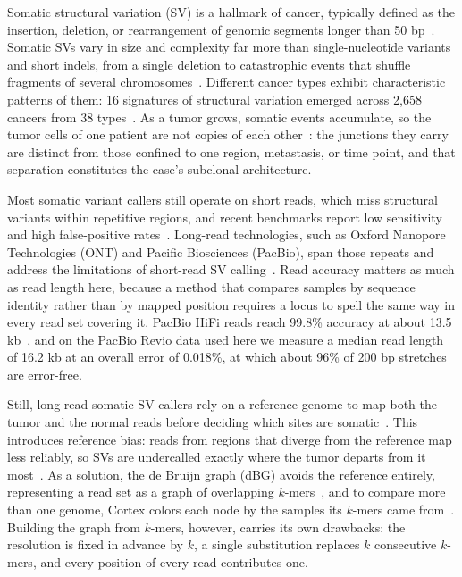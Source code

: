 Somatic structural variation (SV) is a hallmark of cancer, typically defined as the insertion, deletion, or rearrangement of genomic segments longer than 50 bp~\cite{cosenza}. Somatic SVs vary in size and complexity far more than single-nucleotide variants and short indels, from a single deletion to catastrophic events that shuffle fragments of several chromosomes~\cite{chromothripsis}. Different cancer types exhibit characteristic patterns of them: 16 signatures of structural variation emerged across 2,658 cancers from 38 types~\cite{pcawg}. As a tumor grows, somatic events accumulate, so the tumor cells of one patient are not copies of each other~\cite{ith}: the junctions they carry are distinct from those confined to one region, metastasis, or time point, and that separation constitutes the case's subclonal architecture.

Most somatic variant callers still operate on short reads, which miss structural variants within repetitive regions, and recent benchmarks report low sensitivity and high false-positive rates~\cite{zook,wagner,parliament2}. Long-read technologies, such as Oxford Nanopore Technologies (ONT) and Pacific Biosciences (PacBio), span those repeats and address the limitations of short-read SV calling~\cite{sedlazeck,logsdon}. Read accuracy matters as much as read length here, because a method that compares samples by sequence identity rather than by mapped position requires a locus to spell the same way in every read set covering it. PacBio HiFi reads reach 99.8\% accuracy at about 13.5 kb~\cite{wenger}, and on the PacBio Revio data used here we measure a median read length of 16.2 kb at an overall error of 0.018\%, at which about 96\% of 200 bp stretches are error-free.

Still, long-read somatic SV callers rely on a reference genome to map both the tumor and the normal reads before deciding which sites are somatic~\cite{severus,savana,nanomonsv}. This introduces reference bias: reads from regions that diverge from the reference map less reliably, so SVs are undercalled exactly where the tumor departs from it most~\cite{refbias}. As a solution, the de Bruijn graph (dBG) avoids the reference entirely, representing a read set as a graph of overlapping $k$-mers~\cite{debruijn}, and to compare more than one genome, Cortex colors each node by the samples its $k$-mers came from~\cite{cortex}. Building the graph from $k$-mers, however, carries its own drawbacks: the resolution is fixed in advance by $k$, a single substitution replaces $k$ consecutive $k$-mers, and every position of every read contributes one.


